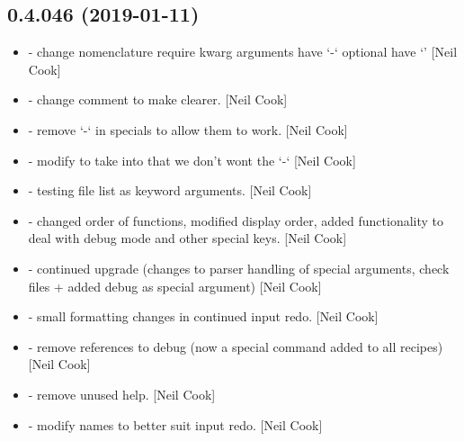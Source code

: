 \documentclass[a4paper,10pt,english]{report}
\begin{document}
\subsection{0.4.046 (2019-01-11)}
\label{\detokenize{misc/changelog:id219}}\begin{itemize}
\item {} 
 - change nomenclature require kwarg arguments have
‘-‘ optional have ‘\textendash{}’ {[}Neil Cook{]}

\item {} 
 - change comment to make clearer. {[}Neil Cook{]}

\item {} 
 - remove ‘-‘ in specials to allow them to work.
{[}Neil Cook{]}

\item {} 
 - modify  to take into that we don’t wont
the ‘-‘ {[}Neil Cook{]}

\item {} 
 - testing file list as keyword arguments. {[}Neil
Cook{]}

\item {} 
 - changed order of functions, modified display
order, added functionality to deal with debug mode and other special
keys. {[}Neil Cook{]}

\item {} 
 - continued upgrade (changes to parser handling of
special arguments, check files + added debug as special argument)
{[}Neil Cook{]}

\item {} 
 - small formatting changes in continued input redo.
{[}Neil Cook{]}

\item {} 
 - remove references to debug (now a special command
added to all recipes) {[}Neil Cook{]}

\item {} 
 - remove unused help. {[}Neil Cook{]}

\item {} 
 - modify names to better suit input redo. {[}Neil Cook{]}

\end{itemize}
\end{document}
